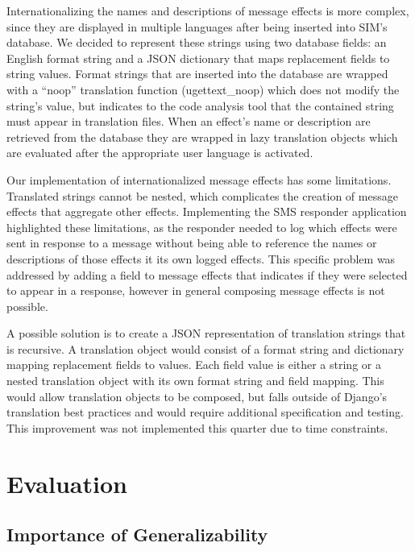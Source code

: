 \documentclass{acm_proc_article-sp}
\begin{document}
Internationalizing the names and descriptions of message effects is more complex, since they are displayed in multiple languages after being inserted into SIM's database. We decided to represent these strings using two database fields: an English format string and a JSON dictionary that maps replacement fields to string values. Format strings that are inserted into the database are wrapped with a ``noop'' translation function (ugettext\_noop) which does not modify the string's value, but indicates to the code analysis tool that the contained string must appear in translation files. When an effect's name or description are retrieved from the database they are wrapped in lazy translation objects which are evaluated after the appropriate user language is activated.

Our implementation of internationalized message effects has some limitations. Translated strings cannot be nested, which complicates the creation of message effects that aggregate other effects. Implementing the SMS responder application highlighted these limitations, as the responder needed to log which effects were sent in response to a message without being able to reference the names or descriptions of those effects it its own logged effects. This specific problem was addressed by adding a field to message effects that indicates if they were selected to appear in a response, however in general composing message effects is not possible.

A possible solution is to create a JSON representation of translation strings that is recursive. A translation object would consist of a format string and dictionary mapping replacement fields to values. Each field value is either a string or a nested translation object with its own format string and field mapping. This would allow translation objects to be composed, but falls outside of Django's translation best practices and would require additional specification and testing. This improvement was not implemented this quarter due to time constraints.

\section{Evaluation}

\subsection{Importance of Generalizability}
\end{document}
